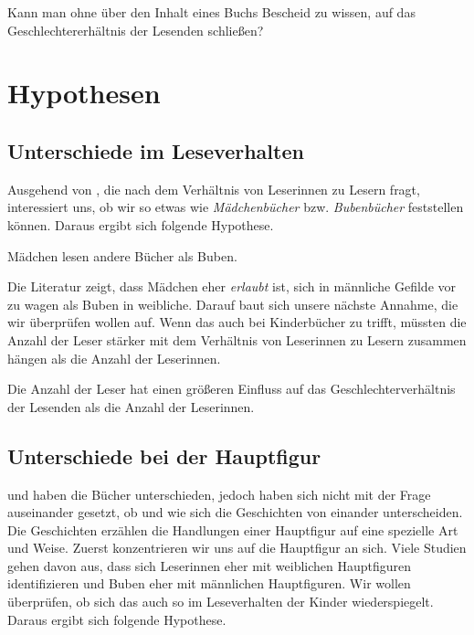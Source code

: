 \begin{frage}\label{fra:merkmale}
Kann man ohne über den Inhalt eines Buchs Bescheid zu wissen, auf das Geschlechtererhältnis der Lesenden schließen?
\end{frage}

\section{Hypothesen}

\subsection{Unterschiede im Leseverhalten}

Ausgehend von , die nach dem Verhältnis von Leserinnen
zu Lesern fragt, interessiert uns, ob wir so etwas wie
\emph{Mädchenbücher} bzw. \emph{Bubenbücher} feststellen können. Daraus
ergibt sich folgende Hypothese.

\begin{hyp}\label{hyp:andere}
    Mädchen lesen andere Bücher als Buben.
\end{hyp}

Die Literatur zeigt, dass Mädchen eher \emph{erlaubt} ist, sich in
männliche Gefilde vor zu wagen als Buben in weibliche. Darauf baut sich
unsere nächste Annahme, die wir überprüfen wollen auf. Wenn das auch bei
Kinderbücher zu trifft, müssten die Anzahl der Leser stärker mit dem
Verhältnis von Leserinnen zu Lesern zusammen hängen als die Anzahl der
Leserinnen.

\begin{subhyp}\label{hyp:anzahl}
    Die Anzahl der Leser hat einen größeren Einfluss auf das Geschlechterverhältnis der Lesenden als die Anzahl der Leserinnen.
\end{subhyp}

\subsection{Unterschiede bei der Hauptfigur}

 und  haben die Bücher
unterschieden, jedoch haben sich nicht mit der Frage auseinander
gesetzt, ob und wie sich die Geschichten von einander unterscheiden. Die
Geschichten erzählen die Handlungen einer Hauptfigur auf eine spezielle
Art und Weise. Zuerst konzentrieren wir uns auf die Hauptfigur an sich.
Viele Studien gehen davon aus, dass sich Leserinnen eher mit weiblichen
Hauptfiguren identifizieren und Buben eher mit männlichen Hauptfiguren.
Wir wollen überprüfen, ob sich das auch so im Leseverhalten der Kinder
wiederspiegelt. Daraus ergibt sich folgende Hypothese.

